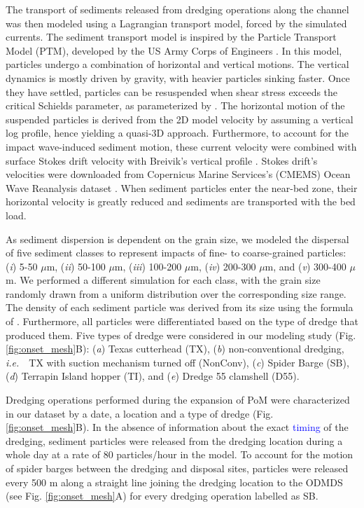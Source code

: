 \documentclass[preprint,12pt,authoryear]{elsarticle}
\newcommand{\ie}{{\it i.e.}\ }
\newcommand{\modif}[1]{\textcolor{blue}{#1}}
\begin{document}
The transport of sediments released from dredging operations along the channel was then modeled using a Lagrangian transport model, forced by the simulated currents. The sediment transport model is inspired by the Particle Transport Model (PTM), developed by the US Army Corps of Engineers \citep{macdonald2006ptm}. In this model, particles undergo a combination of horizontal and vertical motions. The vertical dynamics is mostly driven by gravity, with heavier particles sinking faster. Once they have settled, particles can be resuspended when shear stress exceeds   the critical Schields parameter, as parameterized by \cite{soulsby1997threshold}. The horizontal motion of the suspended particles is derived from the 2D model velocity by assuming a vertical log profile, hence yielding a quasi-3D approach. Furthermore, to account for the impact wave-induced sediment motion, these current velocity were combined with surface Stokes drift velocity with Breivik's vertical profile \citep{breivik2016stokes}. Stokes drift's velocities were downloaded from Copernicus Marine Services's (CMEMS) Ocean Wave Reanalysis dataset \citep{cmems}. When sediment particles enter the near-bed zone, their horizontal velocity is greatly reduced and sediments are transported with the bed load.

As sediment dispersion is dependent on the grain size, we modeled the dispersal of five sediment classes to represent impacts of fine- to coarse-grained particles: (\textit{i}) 5-50 $\mu$m, (\textit{ii}) 50-100 $\mu$m, (\textit{iii}) 100-200 $\mu$m, (\textit{iv}) 200-300 $\mu$m, and (\textit{v}) 300-400 $\mu$m. We performed a  different simulation for each class, with the grain size randomly drawn from a uniform distribution over the corresponding size range. The density of each sediment particle was derived from its size using the formula of \cite{hamilton1982sound}. Furthermore, all particles were differentiated based on the type of dredge that produced them. Five types of dredge were considered in our modeling study (Fig. \ref{fig:onset_mesh}B): (\textit{a}) Texas cutterhead (TX), (\textit{b}) non-conventional dredging, \ie~TX with suction mechanism turned off (NonConv), (\textit{c}) Spider Barge (SB), (\textit{d}) Terrapin Island hopper (TI), and (\textit{e}) Dredge 55 clamshell (D55).

Dredging operations performed during the expansion of PoM were characterized in our dataset by a date, a location and  a type of dredge (Fig. \ref{fig:onset_mesh}B). In the absence of information about the exact \modif{timing} of the dredging, sediment particles were released from the dredging location during a whole day at a rate of 80 particles/hour in the model. To account for the motion of spider barges between the dredging and disposal sites, particles were released every 500 m along a straight line joining the dredging location to the ODMDS (see Fig. \ref{fig:onset_mesh}A) for every dredging operation labelled as SB.
\end{document}
